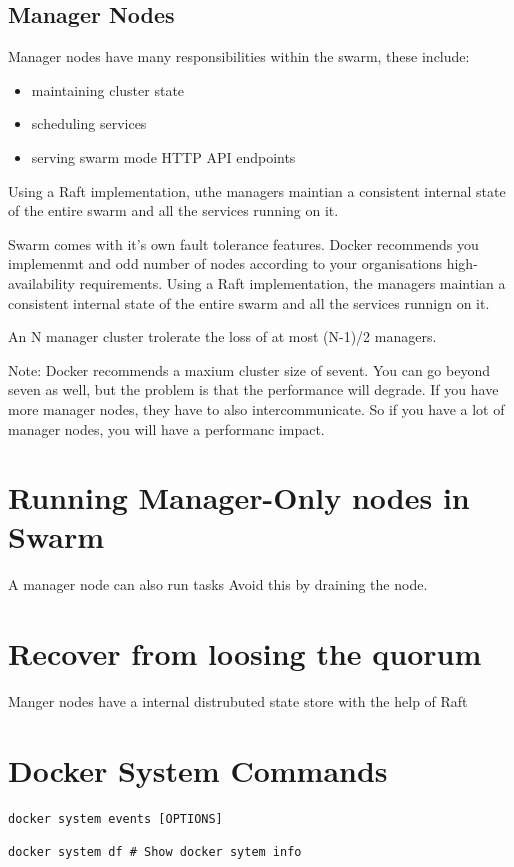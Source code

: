 \documentclass[11pt]{book}
\begin{document}
    \subsection{Manager Nodes}
    Manager nodes have many responsibilities within the swarm, these include:
    \begin{itemize}
        \item maintaining cluster state
        \item scheduling services
        \item serving swarm mode HTTP API endpoints
    \end{itemize}

    Using a Raft implementation, uthe managers maintian a consistent internal state of the entire swarm and all the services running on it.

    Swarm comes with it's own fault tolerance features.
    Docker recommends you implemenmt and odd number of nodes according to your organisations high-availability requirements.
    Using a Raft implementation, the managers maintian a consistent internal state of the entire swarm and all the services runnign on it.

    An N manager cluster trolerate the loss of at most (N-1)/2 managers.

    Note:
    Docker recommends a maxium cluster size of sevent.
    You can go beyond seven as well, but the problem is that the performance will degrade.
    If you have more manager nodes, they have to also intercommunicate.
    So if you have a lot of manager nodes, you will have a performanc impact.

    \section{Running Manager-Only nodes in Swarm}
    A manager node can also run tasks
    Avoid this by draining the node.

    \section{Recover from loosing the quorum}
    Manger nodes have a internal distrubuted state store with the help of Raft
    
    \section{Docker System Commands}
    \begin{lstlisting}[style=terminal]
        docker system events [OPTIONS]
    \end{lstlisting}
    \begin{lstlisting}[style=terminal]
        docker system df # Show docker sytem info
    \end{lstlisting}
\end{document}
